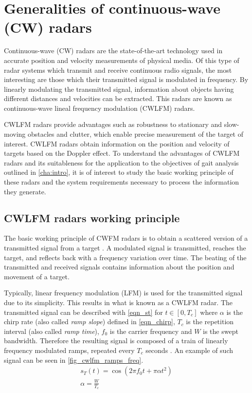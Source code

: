 \chapter{Generalities of continuous-wave (CW) radars} \label{cha:generalities}


Continuous-wave (CW) radars are the state-of-the-art technology used in accurate position and velocity measurements of physical media. Of this type of radar systems which transmit and receive continuous radio signals, the most interesting are those which their transmitted signal is modulated in frequency. By linearly modulating the transmitted signal, information about objects having different distances and velocities can be extracted. This radars are known as continuous-wave lineal frequency modulation (CWLFM) radars.

CWLFM radars provide advantages such as robustness to stationary and slow-moving obstacles and clutter, which enable precise measurement of the target of interest. CWLFM radars obtain information on the position and velocity of targets based on the Doppler effect. To understand the advantages of CWLFM radars and its suitableness for the application to the objectives of gait analysis outlined in \cref{cha:intro}, it is of interest to study the basic working principle of these radars and the system requirements necessary to process the information they generate.

\section{CWLFM radars working principle} \label{sec:cwlfm_wp}

The basic working principle of CWFM radars is to obtain a scattered version of a transmitted signal from a target \cite{Ziemer2009}. A modulated signal is transmitted, reaches the target, and reflects back with a frequency variation over time. The beating of the transmitted and received signals contains information about the position and movement of a target.

Typically, linear frequency modulation (LFM) is used for the transmitted signal due to its simplicity. This results in what is known as a CWLFM radar. The transmitted signal can be described with \cref{eqn_st} \cite{Ziemer2009} for $t \in [0, T_c]$ where $\alpha$ is the chirp rate (also called \textit{ramp slope}) defined in \cref{eqn_chirp}, $T_c$ is the repetition interval (also called \textit{ramp time}), $f_0$ is the carrier frequency and $W$ is the swept bandwidth. Therefore the resulting signal is composed of a train of linearly frequency modulated ramps, repeated every $T_c$ seconds \cite{Sardinero2022}. An example of such signal can be seen in \cref{fig_cwlfm_ramps_freq}.
\begin{gather}
	s_T(t) = \cos{\left(2 \pi f_0 t + \pi \alpha t^2\right)} \label{eqn_st}\\
	\alpha = \frac{W}{T_c} \label{eqn_chirp}
\end{gather}

